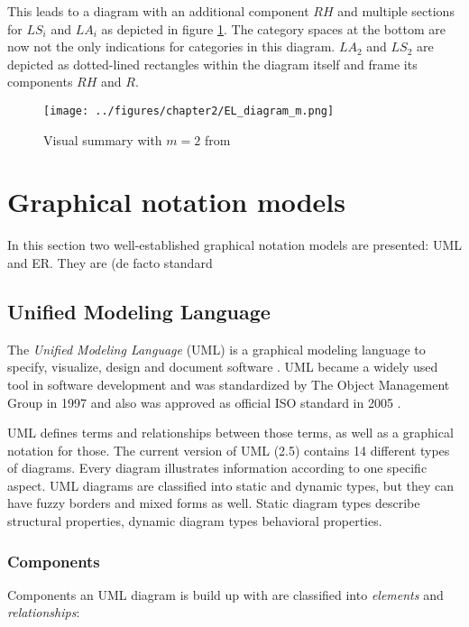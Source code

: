 \documentclass[twoside, openright, 12pt]{book}
\begin{document}
\noindent
This leads to a diagram with an additional component $RH$ and multiple sections for $LS_i$ and $LA_i$ as depicted in figure \ref{fig:EL_diagram_m}.
The category spaces at the bottom are now not the only indications for categories in this diagram.
$LA_2$ and $LS_2$ are depicted as dotted-lined rectangles within the diagram itself and frame its components $RH$ and $R$.

\begin{figure}[htb]
	\centering
	\texttt{[image: ../figures/chapter2/EL\_diagram\_m.png]}
	\caption{Visual summary with $m=2$ from \cite[p.79, figure 4.4]{Amthor18}}
	\label{fig:EL_diagram_m}
\end{figure}



\section{Graphical notation models}
\label{graphical_notations}
In this section two well-established graphical notation models are presented: UML and ER.
They are (de facto standard

\subsection{Unified Modeling Language}
\label{UML}
The \textit{Unified Modeling Language} (UML) is a graphical modeling language to specify, visualize, design and document software \citep{UML_OMG}.
UML became a widely used tool in software development and was standardized by The Object Management Group in 1997 and also was approved as official ISO standard in 2005 \citep{UML_ISO}.

UML defines terms and relationships between those terms, as well as a graphical notation for those.
The current version of UML (2.5) contains 14 different types of diagrams.
Every diagram illustrates information according to one specific aspect.
UML diagrams are classified into static and dynamic types, but they can have fuzzy borders and mixed forms as well.
Static diagram types describe structural properties, dynamic diagram types behavioral properties.



\subsubsection{Components}
Components an UML diagram is build up with are classified into \textit{elements} and \textit{relationships}:
\end{document}
